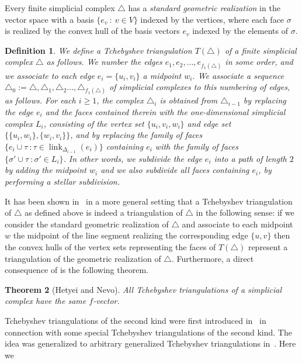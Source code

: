\documentclass[reqno,12pt]{amsart}
\numberwithin{equation}{section}
\newtheorem{theorem}{Theorem}[section]
\newtheorem{definition}[theorem]{Definition}
\DeclareMathOperator{\link}{link}
\newcommand{\0}{\widehat{0}}
\newcommand{\1}{\widehat{1}}
\newcommand{\2}{\widehat{2}}
\begin{document}
Every finite simplicial complex $\triangle$
has a {\em standard geometric realization} in the vector space with
a basis $\{e_v\::\: v\in V\}$ indexed by the vertices, where each face
$\sigma$ is realized by the convex hull of the basis vectors $e_v$
indexed by the elements of $\sigma$. 
\begin{definition}
We define a {\em Tchebyshev triangulation} $T(\triangle)$ of a finite
simplicial complex $\triangle$ as follows. We number the edges $e_1,
e_2, \ldots, e_{f_1(\triangle)}$ in some order, and we associate to each
edge $e_i=\{u_i,v_i\}$ a midpoint $w_i$. We associate a sequence
$\triangle_0:=\triangle,\triangle_{1},\triangle_{2}\ldots,\triangle_{f_1(\triangle)}$
of simplicial complexes to this numbering of edges, as
follows. For each $i\geq 1$, the complex $\triangle_{i}$ is obtained
from $\triangle_{i-1}$ by replacing the edge $e_i$ and the faces
contained therein with the one-dimensional simplicial complex $L_i$,
consisting of the vertex set $\{u_i,v_i,w_i\}$ and edge set
$\{\{u_i,w_i\}, \{w_i,v_i\}\}$,  and by replacing the family of faces
$\{e_i\cup\tau\:: \tau\in \link_{\Delta_{i-1}}(e_i)\}$ containing $e_i$
with the family of faces $\{\sigma'\cup \tau \:: \sigma'\in L_i\}$. In
other words, we subdivide the edge $e_i$ into a path of length $2$ by
adding the midpoint $w_i$ and we also subdivide all faces containing
$e_i$, by performing a stellar subdivision. 
\end{definition}  
It has been shown in~\cite{Hetyei-Nevo} in a more general setting that a
Tchebyshev triangulation of $\triangle$ as defined above is indeed a
triangulation of $\triangle$ in the following sense: if we consider the
standard geometric realization of $\triangle$ and associate to each
midpoint $w$ the midpoint of the line segment realizing the
corresponding edge $\{u,v\}$ then the convex hulls of the vertex sets
representing the faces of $T(\triangle)$ represent a triangulation of
the geometric realization of $\triangle$. Furthermore, a direct
consequence of \cite[Theorem 3.3]{Hetyei-Nevo} is the following theorem.
\begin{theorem}[Hetyei and Nevo]
\label{thm:Hetyei-Nevo}  
All Tchebyshev triangulations of a simplicial complex have the same $f$-vector.
\end{theorem}
Tchebyshev triangulations of the second kind were first introduced
in~\cite{Hetyei-tt} in connection with some special Tchebyshev
triangulations of the second kind. The idea was generalized to arbitrary
generalized Tchebyshev triangulations in~\cite{Hetyei-Nevo}. Here we
\end{document}
